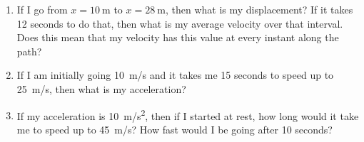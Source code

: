 \begin{enumerate}
\item If I go from $x=\SI{10}{\meter} $ to $ x=\SI{28}{\meter}$, then what is my displacement? If it takes 12 seconds to do that, then what is my average velocity over that interval. Does this mean that my velocity has this value at every instant along the path?\bigskip

\item If I am initially going \SI{+10}{\meter / \second} and it takes me 15 seconds to speed up to  \SI{+25}{\meter/ \second}, then what is my acceleration?\bigskip

\item If my acceleration is \SI{+10}{\meter / \second^2}, then if I started at rest, how long would it take me to speed up to \SI{+45}{\meter /\second}? How fast would I be going after 10 seconds?\hugeskip



\end{enumerate}